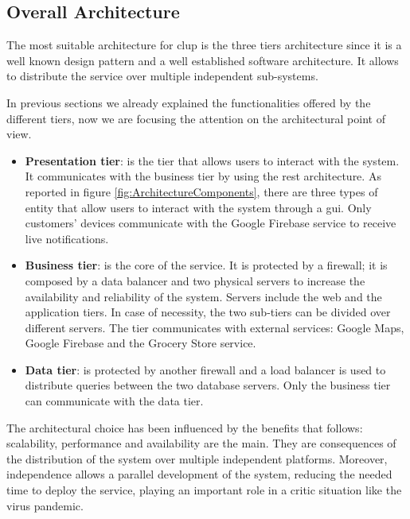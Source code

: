 \subsection{Overall Architecture}

The most suitable architecture for \gls{clup} is the three tiers architecture since it is a well known design pattern and a well established software architecture. It allows to distribute the service over multiple independent sub-systems.

In previous sections we already explained the functionalities offered by the different tiers, now we are focusing the attention on the architectural point of view.
\begin{itemize}
	\item \textbf{Presentation tier}: is the tier that allows users to interact with the system. It communicates with the business tier by using the \gls{rest} architecture.
	As reported in figure \ref{fig:ArchitectureComponents}, there are three types of entity that allow users to interact with the system through a \gls{gui}. Only customers' devices communicate with the Google Firebase service to receive live notifications.
	\item \textbf{Business tier}: is the core of the service. It is protected by a firewall; it is composed by a data balancer and two physical servers to increase the availability and reliability of the system. Servers include the web and the application tiers. In case of necessity, the two sub-tiers can be divided over different servers.
	The tier communicates with external services: Google Maps, Google Firebase and the Grocery Store service.
	\item \textbf{Data tier}: is protected by another firewall and a load balancer is used to distribute queries between the two database servers. Only the business tier can communicate with the data tier.
\end{itemize}

The architectural choice has been influenced by the benefits that follows: scalability, performance and availability are the main. They are consequences of the distribution of the system over multiple independent platforms.
Moreover, independence allows a parallel development of the system, reducing the needed time to deploy the service, playing an important role in a critic situation like the virus pandemic.

